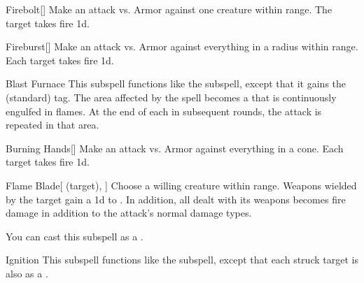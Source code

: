 \begin{ability}[\nth{1}]{Firebolt}[]
Make an attack vs. Armor against one creature within \rngmed range.
\hit The target takes fire  \plus1d.
\end{ability}
\vspace{0.25em}


\begin{ability}[\nth{1}]{Fireburst}[]
Make an attack vs. Armor against everything in a \areasmall radius within \rngclose range.
\hit Each target takes fire  \minus1d.
\end{ability}
\vspace{0.25em}


\begin{ability}[\nth{2}]{Blast Furnace}
This subspell functions like the  subspell, except that it gains the  (standard) tag.
The area affected by the spell becomes a  that is continuously engulfed in flames.
At the end of each  in subsequent rounds, the attack is repeated in that area.
\end{ability}
\vspace{0.25em}


\begin{ability}[\nth{2}]{Burning Hands}[]
Make an attack vs. Armor against everything in a \arealarge cone.
\hit Each target takes fire  \minus1d.
\end{ability}
\vspace{0.25em}


\begin{ability}[\nth{2}]{Flame Blade}[ (target), ]
Choose a willing creature within \rngclose range.
Weapons wielded by the target gain a \plus1d  to .
In addition, all  dealt with its weapons becomes fire damage in addition to the attack's normal damage types.

You can cast this subspell as a .
\end{ability}
\vspace{0.25em}


\begin{ability}[\nth{2}]{Ignition}
This subspell functions like the  subspell, except that each struck target is also  as a .
\end{ability}
\vspace{0.25em}


